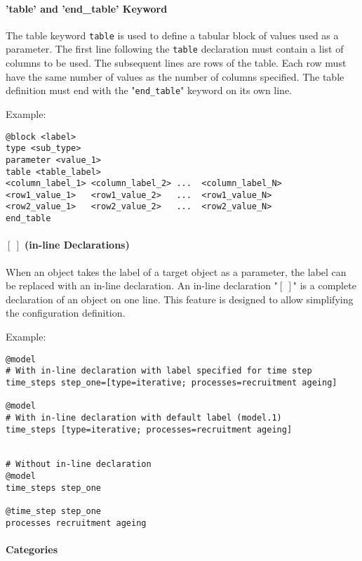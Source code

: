 \paragraph*{'table' and 'end\_table' Keyword}

The table keyword \texttt{table} is used to define a tabular block of values used as a parameter. The first line following the \texttt{table} declaration must contain a list of columns to be used. The subsequent lines are rows of the table. Each row must have the same number of values as the number of columns specified. The table definition must end with the "\texttt{end\_table}" keyword on its own line.

Example:

{\small{\begin{verbatim}
@block <label>
type <sub_type>
parameter <value_1>
table <table_label>
<column_label_1> <column_label_2> ...  <column_label_N>
<row1_value_1>   <row1_value_2>   ...  <row1_value_N>
<row2_value_1>   <row2_value_2>   ...  <row2_value_N>
end_table
\end{verbatim}}}

\paragraph*{$[\ ]$ (in-line Declarations)}

When an object takes the label of a target object as a parameter, the label can be replaced with an in-line declaration. An in-line declaration "\texttt{$[\ ]$}" is a complete declaration of an object on one line. This feature is designed to allow simplifying the configuration definition.

Example:

{\small{\begin{verbatim}
@model
# With in-line declaration with label specified for time step
time_steps step_one=[type=iterative; processes=recruitment ageing]

@model
# With in-line declaration with default label (model.1)
time_steps [type=iterative; processes=recruitment ageing]


# Without in-line declaration
@model
time_steps step_one

@time_step step_one
processes recruitment ageing
\end{verbatim}}}

\paragraph*{Categories}

